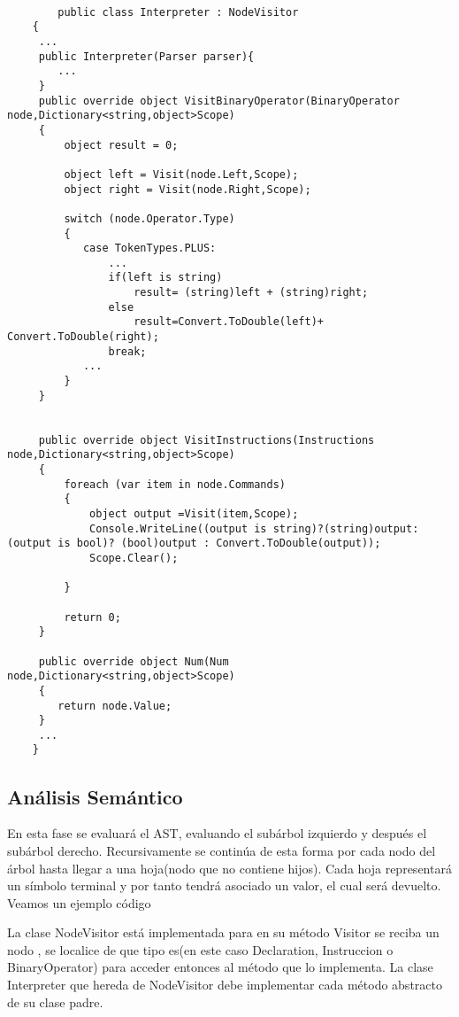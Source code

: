 \documentclass[a4paper,12pt]{article}
\begin{document}
    \begin{lstlisting}

        public class Interpreter : NodeVisitor
    {
     ... 
     public Interpreter(Parser parser){
        ...
     }
     public override object VisitBinaryOperator(BinaryOperator node,Dictionary<string,object>Scope)
     {
         object result = 0;
    
         object left = Visit(node.Left,Scope);
         object right = Visit(node.Right,Scope);
    
         switch (node.Operator.Type)
         {
            case TokenTypes.PLUS:
                ... 
                if(left is string)
                    result= (string)left + (string)right;
                else
                    result=Convert.ToDouble(left)+ Convert.ToDouble(right);
                break;
            ...
         }
     }
    
    
     public override object VisitInstructions(Instructions node,Dictionary<string,object>Scope)
     {
         foreach (var item in node.Commands)
         {
             object output =Visit(item,Scope);
             Console.WriteLine((output is string)?(string)output: (output is bool)? (bool)output : Convert.ToDouble(output));
             Scope.Clear();
    
         }
    
         return 0;
     }
    
     public override object Num(Num node,Dictionary<string,object>Scope)
     {
        return node.Value;
     }
     ... 
    }
     \end{lstlisting}
\subsection{An\'alisis Sem\'antico }

En esta fase se evaluar\'a el AST, evaluando el sub\'arbol izquierdo y despu\'es el sub\'arbol derecho. Recursivamente se contin\'ua de esta forma por cada nodo del \'arbol hasta llegar a una hoja(nodo que no contiene hijos). Cada hoja representar\'a un s\'imbolo terminal y por tanto tendr\'a asociado un valor, el cual ser\'a devuelto. Veamos un ejemplo c\'odigo


 La clase NodeVisitor est\'a implementada para en su m\'etodo Visitor se reciba un nodo , se localice de que tipo es(en este caso Declaration, Instruccion o BinaryOperator) para acceder entonces al m\'etodo que lo implementa.
 La clase Interpreter que hereda de NodeVisitor debe implementar cada m\'etodo abstracto de su clase padre.
 
\end{document}
